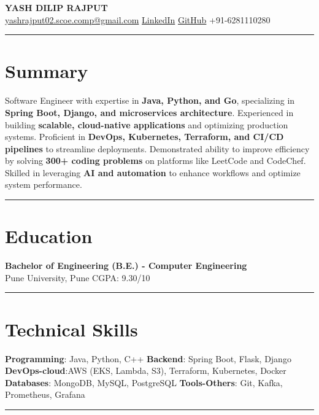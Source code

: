 \documentclass[a4paper,10pt]{article}
\begin{document}
\begin{center}
    {\LARGE \textbf{YASH DILIP RAJPUT}}\\
    \href{mailto:yashrajput02.scoe.comp@gmail.com}{yashrajput02.scoe.comp@gmail.com} \textbar
    \href{https://www.linkedin.com/in/yashrajput7232}{LinkedIn} \textbar
    \href{https://github.com/yash7232}{GitHub} \textbar
    +91-6281110280
\end{center}

\hrule
\vspace{3pt}
\section*{Summary}  
Software Engineer with expertise in \textbf{Java, Python, and Go}, specializing in \textbf{Spring Boot, Django, and microservices architecture}. Experienced in building \textbf{scalable, cloud-native applications} and optimizing production systems. Proficient in \textbf{DevOps, Kubernetes, Terraform, and CI/CD pipelines} to streamline deployments. Demonstrated ability to improve efficiency by solving \textbf{300+ coding problems} on platforms like LeetCode and CodeChef. Skilled in leveraging \textbf{AI and automation} to enhance workflows and optimize system performance.


\vspace{3 pt}
\hrule
\vspace{3pt}

\section*{Education}
\textbf{Bachelor of Engineering (B.E.) - Computer Engineering}\\
Pune University, Pune \hfill CGPA: 9.30/10
\vspace{3 pt}
\hrule
\vspace{3 pt}

\section*{Technical Skills}
\textbf{Programming}: Java, Python, C++ \textbar \space
\textbf{Backend}: Spring Boot, Flask, Django \textbar \space
\textbf{DevOps-cloud}:AWS (EKS, Lambda, S3), Terraform, Kubernetes, Docker \textbar \space
\textbf{Databases}: MongoDB, MySQL, PostgreSQL \textbar \space
\textbf{Tools-Others}: Git, Kafka, Prometheus, Grafana
\vspace{3}

\hrule
\vspace{3pt}
\end{document}
